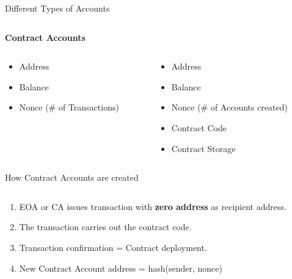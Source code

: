 \documentclass[handout]{beamer}
\begin{document}
\begin{frame}{Different Types of Accounts}
\begin{columns}[T]
\begin{column}{0.45\textwidth}
			\textbf{Contract Accounts}
		\end{column}
	\end{columns}  
\vspace{1em}
	\begin{columns}[T]
		\begin{column}{0.45\textwidth}
			\begin{itemize}
				\item Address
				\item Balance
				\item Nonce (\# of Transactions)
			\end{itemize}
		\end{column}
		\begin{column}{0.45\textwidth}
			\begin{itemize}
				\item Address
				\item Balance
				\item Nonce (\# of Accounts created)
				\item Contract Code
				\item Contract Storage
			\end{itemize}
		\end{column}
	\end{columns}
\vspace{1em}
\end{frame}


\begin{frame}{How Contract Accounts are created}
	\begin{columns}[T]
		\begin{column}{0.6\textwidth}
			\begin{enumerate}
				\item<1-> EOA or CA issues transaction with \textbf{zero address} as recipient address.
				\item<2-> The transaction carries out the contract code.
				\item<2-> Transaction confirmation = Contract deployment.
				\item<2-> New Contract Account address = hash(sender, nonce) %
			\end{enumerate}
		\end{column}
	\end{columns}				
\end{frame}
\end{document}

